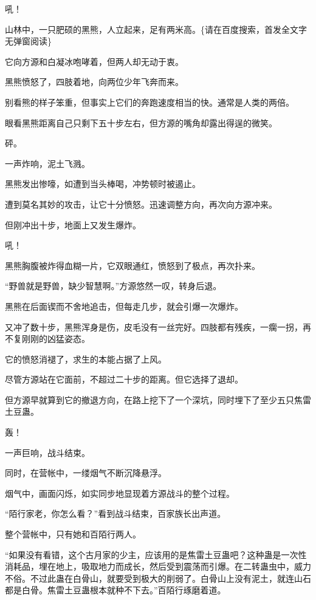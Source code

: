 
\begin{this_body}



吼！

山林中，一只肥硕的黑熊，人立起来，足有两米高。\{请在百度搜索，首发全文字无弹窗阅读\}

它向方源和白凝冰咆哮着，但两人却无动于衷。

黑熊愤怒了，四肢着地，向两位少年飞奔而来。

别看熊的样子笨重，但事实上它们的奔跑速度相当的快。通常是人类的两倍。

眼看黑熊距离自己只剩下五十步左右，但方源的嘴角却露出得逞的微笑。

砰。

一声炸响，泥土飞溅。

黑熊发出惨嚎，如遭到当头棒喝，冲势顿时被遏止。

遭到莫名其妙的攻击，让它十分愤怒。迅速调整方向，再次向方源冲来。

但刚冲出十步，地面上又发生爆炸。

吼！

黑熊胸腹被炸得血糊一片，它双眼通红，愤怒到了极点，再次扑来。

“野兽就是野兽，缺少智慧啊。”方源悠然一叹，转身后退。

黑熊在后面锲而不舍地追击，但每走几步，就会引爆一次爆炸。

又冲了数十步，黑熊浑身是伤，皮毛没有一丝完好。四肢都有残疾，一瘸一拐，再不复刚刚的凶猛姿态。

它的愤怒消褪了，求生的本能占据了上风。

尽管方源站在它面前，不超过二十步的距离。但它选择了退却。

但方源早就算到它的撤退方向，在路上挖下了一个深坑，同时埋下了至少五只焦雷土豆蛊。

轰！

一声巨响，战斗结束。

同时，在营帐中，一缕烟气不断沉降悬浮。

烟气中，画面闪烁，如实同步地显现着方源战斗的整个过程。

“陌行家老，你怎么看？”看到战斗结束，百家族长出声道。

整个营帐中，只有她和百陌行两人。

“如果没有看错，这个古月家的少主，应该用的是焦雷土豆蛊吧？这种蛊是一次性消耗品，埋在地上，吸取地力而成长，然后受到震荡而引爆。在二转蛊虫中，威力不俗。不过此蛊在白骨山，就要受到极大的削弱了。白骨山上没有泥土，就连山石都是白骨。焦雷土豆蛊根本就种不下去。”百陌行琢磨着道。


\end{this_body}
